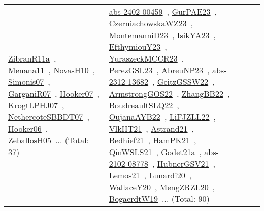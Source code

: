 {\begin{longtable}{lp{3cm}>{\raggedright\arraybackslash}p{6cm}>{\raggedright\arraybackslash}p{6cm}>{\raggedright\arraybackslash}p{8cm}}
\href{works/ZibranR11a.pdf}{ZibranR11a}~\cite{ZibranR11a}, \href{works/Menana11.pdf}{Menana11}~\cite{Menana11}, \href{works/NovasH10.pdf}{NovasH10}~\cite{NovasH10}, \href{works/Simonis07.pdf}{Simonis07}~\cite{Simonis07}, \href{works/GarganiR07.pdf}{GarganiR07}~\cite{GarganiR07}, \href{works/Hooker07.pdf}{Hooker07}~\cite{Hooker07}, \href{works/KrogtLPHJ07.pdf}{KrogtLPHJ07}~\cite{KrogtLPHJ07}, \href{works/NethercoteSBBDT07.pdf}{NethercoteSBBDT07}~\cite{NethercoteSBBDT07}, \href{works/Hooker06.pdf}{Hooker06}~\cite{Hooker06}, \href{works/ZeballosH05.pdf}{ZeballosH05}~\cite{ZeballosH05}... (Total: 37) & \href{works/abs-2402-00459.pdf}{abs-2402-00459}~\cite{abs-2402-00459}, \href{works/GurPAE23.pdf}{GurPAE23}~\cite{GurPAE23}, \href{works/CzerniachowskaWZ23.pdf}{CzerniachowskaWZ23}~\cite{CzerniachowskaWZ23}, \href{works/MontemanniD23.pdf}{MontemanniD23}~\cite{MontemanniD23}, \href{works/IsikYA23.pdf}{IsikYA23}~\cite{IsikYA23}, \href{works/EfthymiouY23.pdf}{EfthymiouY23}~\cite{EfthymiouY23}, \href{works/YuraszeckMCCR23.pdf}{YuraszeckMCCR23}~\cite{YuraszeckMCCR23}, \href{works/PerezGSL23.pdf}{PerezGSL23}~\cite{PerezGSL23}, \href{works/AbreuNP23.pdf}{AbreuNP23}~\cite{AbreuNP23}, \href{works/abs-2312-13682.pdf}{abs-2312-13682}~\cite{abs-2312-13682}, \href{works/GeitzGSSW22.pdf}{GeitzGSSW22}~\cite{GeitzGSSW22}, \href{works/ArmstrongGOS22.pdf}{ArmstrongGOS22}~\cite{ArmstrongGOS22}, \href{works/ZhangBB22.pdf}{ZhangBB22}~\cite{ZhangBB22}, \href{works/BoudreaultSLQ22.pdf}{BoudreaultSLQ22}~\cite{BoudreaultSLQ22}, \href{works/OujanaAYB22.pdf}{OujanaAYB22}~\cite{OujanaAYB22}, \href{works/LiFJZLL22.pdf}{LiFJZLL22}~\cite{LiFJZLL22}, \href{works/VlkHT21.pdf}{VlkHT21}~\cite{VlkHT21}, \href{works/Astrand21.pdf}{Astrand21}~\cite{Astrand21}, \href{works/Bedhief21.pdf}{Bedhief21}~\cite{Bedhief21}, \href{works/HamPK21.pdf}{HamPK21}~\cite{HamPK21}, \href{works/QinWSLS21.pdf}{QinWSLS21}~\cite{QinWSLS21}, \href{works/Godet21a.pdf}{Godet21a}~\cite{Godet21a}, \href{works/abs-2102-08778.pdf}{abs-2102-08778}~\cite{abs-2102-08778}, \href{works/HubnerGSV21.pdf}{HubnerGSV21}~\cite{HubnerGSV21}, \href{works/Lemos21.pdf}{Lemos21}~\cite{Lemos21}, \href{works/Lunardi20.pdf}{Lunardi20}~\cite{Lunardi20}, \href{works/WallaceY20.pdf}{WallaceY20}~\cite{WallaceY20}, \href{works/MengZRZL20.pdf}{MengZRZL20}~\cite{MengZRZL20}, \href{works/BogaerdtW19.pdf}{BogaerdtW19}~\cite{BogaerdtW19}... (Total: 90)\\

\end{longtable}}
